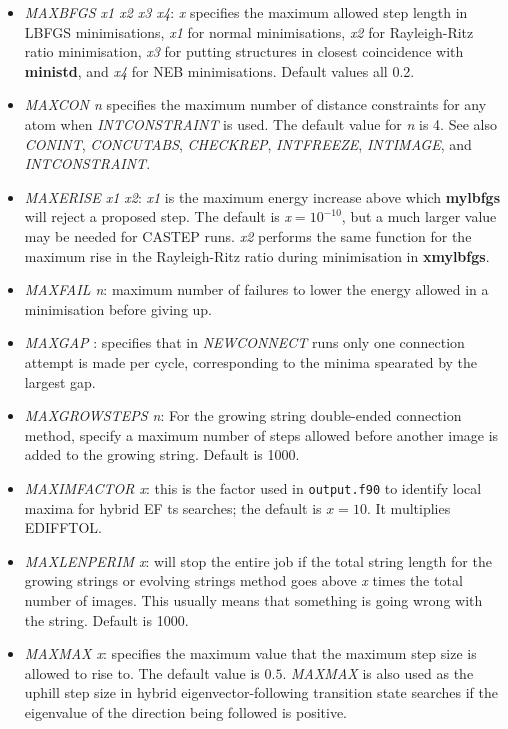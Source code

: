 \documentclass[12pt,a4paper,dvips]{article}
\begin{document}
\begin{itemize}
\item {\it MAXBFGS x1 x2 x3 x4\/}: {\it x\/} specifies the maximum allowed step length in LBFGS
minimisations, {\it x1\/} for  normal minimisations, {\it x2\/} for Rayleigh-Ritz ratio
minimisation, {\it x3\/} for putting structures in closest coincidence with
{\bf ministd}, and {\it x4\/} for NEB minimisations. Default values all 0.2.

\item{\it MAXCON n\/} specifies the maximum number of distance constraints for any atom
when {\it INTCONSTRAINT\/} is used. The default value for {\it n\/} is 4.
See also
{\it CONINT\/},
{\it CONCUTABS\/},
{\it CHECKREP\/},
{\it INTFREEZE\/},
{\it INTIMAGE\/}, and
{\it INTCONSTRAINT\/}.

\item {\it MAXERISE x1 x2\/}: {\it x1} is the maximum energy increase above which
{\bf mylbfgs} will reject a proposed step. The default is {\it x}$=10^{-10}$, but
a much larger value may be needed for CASTEP runs.
{\it x2\/} performs the same function for the maximum rise in the Rayleigh-Ritz ratio
during minimisation in {\bf xmylbfgs}.

\item {\it MAXFAIL n\/}: maximum number of failures 
to lower the energy allowed in a minimisation before giving up.

\item {\it MAXGAP \/}: specifies that in {\it NEWCONNECT\/} runs
only one connection attempt is made per cycle, corresponding to the
minima spearated by the largest gap.

\item {\it MAXGROWSTEPS n\/}: For the growing string double-ended connection
  method, specify a maximum number of steps allowed before another image is
  added to the growing string. Default is 1000. 

\item {\it MAXIMFACTOR x\/}: this is the factor used in {\tt output.f90} to identify local maxima for hybrid EF ts searches;
the default is $x=10$. It multiplies EDIFFTOL.

\item {\it MAXLENPERIM x\/}: will stop the entire job if the total string
  length for the growing strings or evolving strings method goes above {\it x}
  times the total number of images. This usually means that something is going
  wrong with the string. Default is 1000. 

\item {\it MAXMAX x\/}: specifies the maximum value that the maximum step size 
is allowed to rise to. The default value is $0.5$.
{\it MAXMAX\/} is also used as the uphill step size in hybrid eigenvector-following
transition state searches if the eigenvalue of the direction being followed is positive.


\end{itemize}
\end{document}
